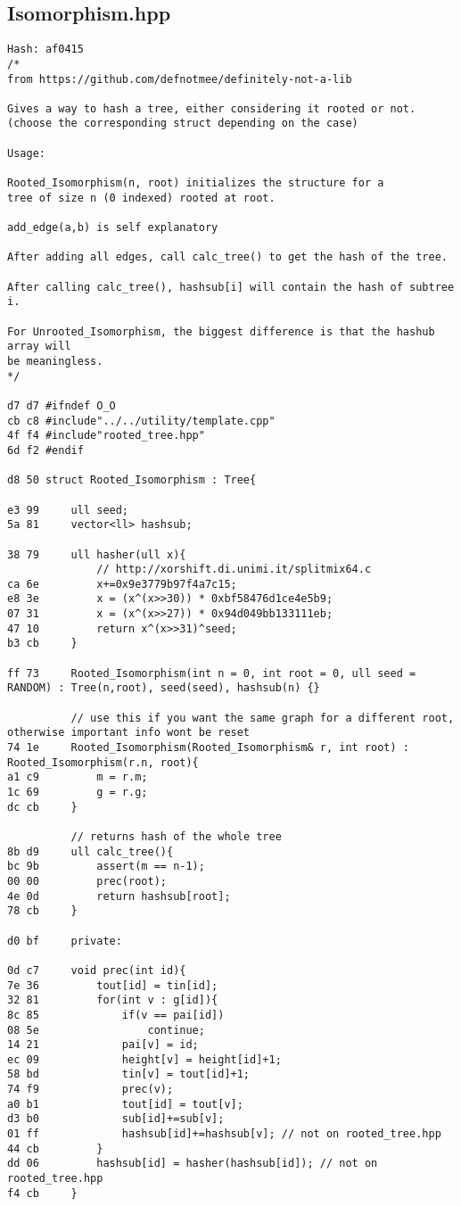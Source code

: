 \documentclass[11pt, a4paper, twoside]{article}
\begin{document}
\subsection{Isomorphism.hpp}
\begin{lstlisting}
Hash: af0415
/*
from https://github.com/defnotmee/definitely-not-a-lib

Gives a way to hash a tree, either considering it rooted or not.
(choose the corresponding struct depending on the case)

Usage:

Rooted_Isomorphism(n, root) initializes the structure for a
tree of size n (0 indexed) rooted at root.

add_edge(a,b) is self explanatory

After adding all edges, call calc_tree() to get the hash of the tree.

After calling calc_tree(), hashsub[i] will contain the hash of subtree i.

For Unrooted_Isomorphism, the biggest difference is that the hashub array will
be meaningless.
*/

d7 d7 #ifndef O_O
cb c8 #include"../../utility/template.cpp"
4f f4 #include"rooted_tree.hpp"
6d f2 #endif

d8 50 struct Rooted_Isomorphism : Tree{
      
e3 99     ull seed;
5a 81     vector<ll> hashsub;
      
38 79     ull hasher(ull x){
              // http://xorshift.di.unimi.it/splitmix64.c
ca 6e         x+=0x9e3779b97f4a7c15;
e8 3e         x = (x^(x>>30)) * 0xbf58476d1ce4e5b9;
07 31         x = (x^(x>>27)) * 0x94d049bb133111eb;
47 10         return x^(x>>31)^seed;
b3 cb     }
      
ff 73     Rooted_Isomorphism(int n = 0, int root = 0, ull seed = RANDOM) : Tree(n,root), seed(seed), hashsub(n) {}
      
          // use this if you want the same graph for a different root, otherwise important info wont be reset
74 1e     Rooted_Isomorphism(Rooted_Isomorphism& r, int root) : Rooted_Isomorphism(r.n, root){
a1 c9         m = r.m;
1c 69         g = r.g;
dc cb     }
      
          // returns hash of the whole tree
8b d9     ull calc_tree(){
bc 9b         assert(m == n-1);
00 00         prec(root);
4e 0d         return hashsub[root];
78 cb     }
      
d0 bf     private:
      
0d c7     void prec(int id){
7e 36         tout[id] = tin[id];
32 81         for(int v : g[id]){
8c 85             if(v == pai[id])
08 5e                 continue;
14 21             pai[v] = id;
ec 09             height[v] = height[id]+1;
58 bd             tin[v] = tout[id]+1;
74 f9             prec(v);
a0 b1             tout[id] = tout[v];
d3 b0             sub[id]+=sub[v];
01 ff             hashsub[id]+=hashsub[v]; // not on rooted_tree.hpp
44 cb         }
dd 06         hashsub[id] = hasher(hashsub[id]); // not on rooted_tree.hpp
f4 cb     }
      

\end{lstlisting}
\end{document}
